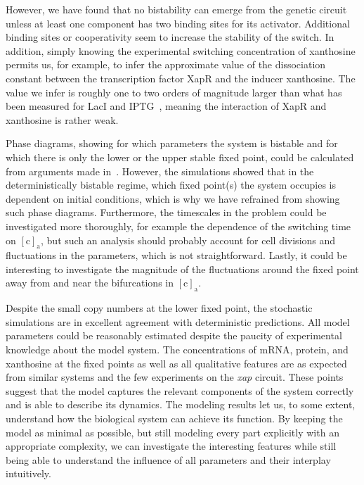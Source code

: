 \documentclass[10pt,letterpaper]{article}
\newcommand{\n}[1]{\mathrm{#1}}
\begin{document}
	However, we have found that no bistability can emerge from the genetic circuit unless
	at least one component has two binding sites for its activator. Additional
	binding sites or cooperativity seem to increase the stability of the switch.
	In addition, simply knowing the experimental switching concentration of
	xanthosine permits us, for example, to infer the approximate value of the
	dissociation constant between the transcription factor XapR and the inducer
	xanthosine. The value we infer is roughly one to two orders of magnitude
	larger than what has been measured for LacI and
	IPTG~\cite{RazoMejia2018}, meaning the interaction of XapR and
	xanthosine is rather weak.
	
	Phase diagrams, showing for which parameters the system is bistable and for
	which there is only the lower or the upper stable fixed point, could be
	calculated from arguments made in~\cite{Cherry2000}. However, the
	simulations showed that in the deterministically bistable regime, which fixed point(s) the system occupies is dependent on initial conditions, which is why we have refrained from showing such phase
	diagrams. Furthermore, the timescales in the problem could be investigated
	more thoroughly, for example the dependence of the switching time on
	$\n{[c]_a}$, but such an analysis should probably account for	cell divisions and fluctuations in the parameters, which is not straightforward. Lastly, it could be interesting to investigate the magnitude of the fluctuations around the fixed point away from and near the bifurcations in $\mathrm{[c]_a}$.
	
	Despite the small copy numbers at the lower fixed point, the stochastic simulations are in excellent agreement with deterministic predictions. All model parameters could be reasonably estimated despite the paucity of
	experimental knowledge about the model system. The concentrations of mRNA, protein, and xanthosine at the fixed points as well as all qualitative features are as expected from similar systems and the few experiments on the \emph{xap} circuit. These points suggest that the model captures the relevant components of the system correctly and is able to describe its
	dynamics. 
	The modeling results let us, to some extent, understand how the biological system can achieve its function. By keeping the model as minimal as possible, but still modeling every part explicitly with an appropriate complexity, we can investigate the interesting features while still being able to understand the influence of all parameters and their interplay intuitively.
		
\end{document}
